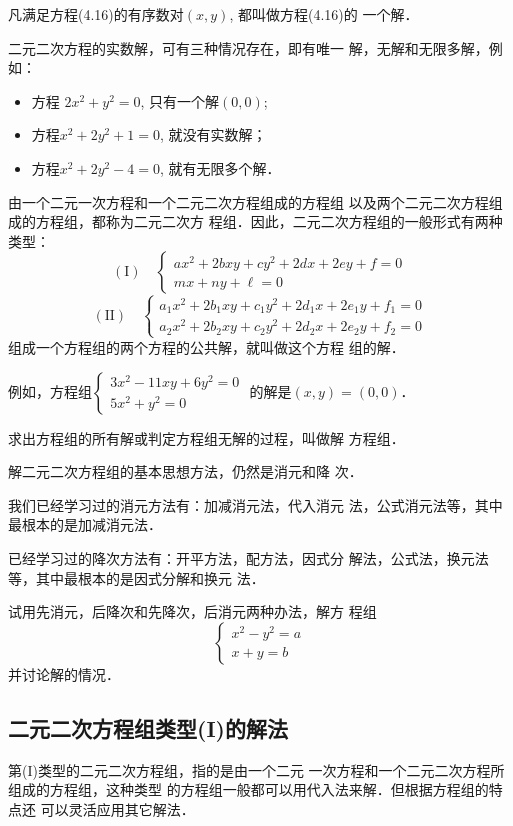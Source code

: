 凡满足方程(4.16)的有序数对$(x,y)$, 都叫做方程(4.16)的
一个解．

二元二次方程的实数解，可有三种情况存在，即有唯一
解，无解和无限多解，例如：
\begin{itemize}
    \item 方程 $2x^2+y^2=0$, 只有一个解$(0,0)$;
    \item 方程$x^2+2y^2+1=0$, 就没有实数解；
    \item 方程$x^2+2y^2-4=0$, 就有无限多个解．
\end{itemize}

由一个二元一次方程和一个二元二次方程组成的方程组
以及两个二元二次方程组成的方程组，都称为二元二次方
程组．因此，二元二次方程组的一般形式有两种类型：
\[(\text{I})\quad \begin{cases}
    ax^2+2bxy+cy^2+2dx+2ey+f=0\\
mx+ny+\ell=0
\end{cases}\]
\[(\text{II})\quad \begin{cases}
    a_1x^2+2b_1xy+c_1y^2+2d_1x+2e_1y+f_1=0\\
    a_2x^2+2b_2xy+c_2y^2+2d_2x+2e_2y+f_2=0
\end{cases}\]
组成一个方程组的两个方程的公共解，就叫做这个方程
组的解．

例如，方程组$\begin{cases}
 3x^2-11xy+6y^2=0\\
5x^2+y^2=0   
\end{cases}$
的解是$(x,y)=(0,0)$．
    
求出方程组的所有解或判定方程组无解的过程，叫做解
方程组．

解二元二次方程组的基本思想方法，仍然是消元和降
次．

我们已经学习过的消元方法有：加减消元法，代入消元
法，公式消元法等，其中最根本的是加减消元法．

已经学习过的降次方法有：开平方法，配方法，因式分
解法，公式法，换元法等，其中最根本的是因式分解和换元
法．

\begin{ex}
    试用先消元，后降次和先降次，后消元两种办法，解方
程组$$\begin{cases}
  x^2-y^2=a\\
x+y=b  
\end{cases}$$
并讨论解的情况．
\end{ex}

\subsection{二元二次方程组类型(I)的解法}
第(I)类型的二元二次方程组，指的是由一个二元
一次方程和一个二元二次方程所组成的方程组，这种类型
的方程组一般都可以用代入法来解．但根据方程组的特点还
可以灵活应用其它解法．


